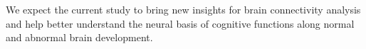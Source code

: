 We expect the current study to bring new
insights for brain connectivity analysis and help better
understand the neural basis of cognitive functions along
normal and abnormal brain development. \cite{Zhang2022}

